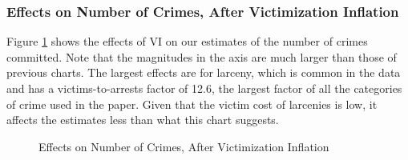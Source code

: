 \subsubsection{Effects on Number of Crimes, After Victimization Inflation}
\noindent Figure \ref{fig:count-vi} shows the effects of VI on our estimates of the number of crimes committed. Note that the magnitudes in the axis are much larger than those of previous charts. The largest effects are for larceny, which is common in the data and has a victims-to-arrests factor of 12.6, the largest factor of all the categories of crime used in the paper. Given that the victim cost of larcenies is low, it affects the estimates less than what this chart suggests. \\

\begin{figure}[H]
\caption{Effects on Number of Crimes, After Victimization Inflation}
\centering \label{fig:count-vi}
{}
\end{figure}

